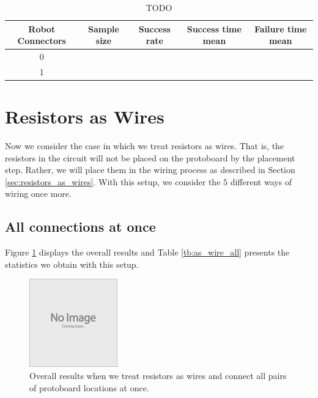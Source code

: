 \begin{table}[H]
\begin{center}
\begin{singlespace}
\begin{tabular}{| c | c | c | c | c |}
\hline
Robot Connectors & Sample size & Success rate & Success time mean &
Failure time mean\\
\hline\hline
0 & & & & \\
1 & & & & \\
\hline
\end{tabular}
\end{singlespace}
\end{center}
\label{tb:TODO}
\caption{TODO}
\end{table}

\section{Resistors as Wires}

Now we consider the case in which we treat resistors as wires. That is, the
resistors in the circuit will not be placed on the protoboard by the placement
step. Rather, we will place them in the wiring process as described in Section
\ref{sec:resistors_as_wires}. With this setup, we consider the $5$ different
ways of wiring once more.

\subsection{All connections at once}

Figure \ref{fig:as_wire_all} displays the overall results and Table
\ref{tb:as_wire_all} presents the statistics we obtain with this setup.

\begin{figure}[H]
\begin{center}
\includegraphics{Images/placeholder.jpg}
\caption{Overall results when we treat resistors as wires and connect all
pairs of protoboard locations at once.}
\label{fig:as_wire_all}
\end{center}
\end{figure}

